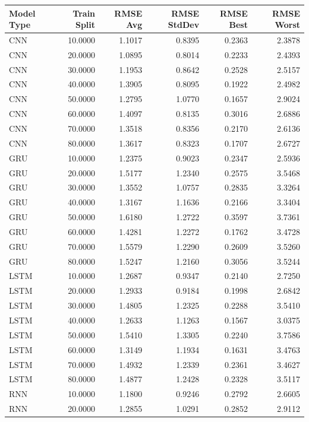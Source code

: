 \begin{tabular}{lrrrrr}
\toprule
Model Type & Train Split & RMSE Avg & RMSE StdDev & RMSE Best & RMSE Worst \\
\midrule
CNN & 10.0000 & 1.1017 & 0.8395 & 0.2363 & 2.3878 \\
CNN & 20.0000 & 1.0895 & 0.8014 & 0.2233 & 2.4393 \\
CNN & 30.0000 & 1.1953 & 0.8642 & 0.2528 & 2.5157 \\
CNN & 40.0000 & 1.3905 & 0.8095 & 0.1922 & 2.4982 \\
CNN & 50.0000 & 1.2795 & 1.0770 & 0.1657 & 2.9024 \\
CNN & 60.0000 & 1.4097 & 0.8135 & 0.3016 & 2.6886 \\
CNN & 70.0000 & 1.3518 & 0.8356 & 0.2170 & 2.6136 \\
CNN & 80.0000 & 1.3617 & 0.8323 & 0.1707 & 2.6727 \\
GRU & 10.0000 & 1.2375 & 0.9023 & 0.2347 & 2.5936 \\
GRU & 20.0000 & 1.5177 & 1.2340 & 0.2575 & 3.5468 \\
GRU & 30.0000 & 1.3552 & 1.0757 & 0.2835 & 3.3264 \\
GRU & 40.0000 & 1.3167 & 1.1636 & 0.2166 & 3.3404 \\
GRU & 50.0000 & 1.6180 & 1.2722 & 0.3597 & 3.7361 \\
GRU & 60.0000 & 1.4281 & 1.2272 & 0.1762 & 3.4728 \\
GRU & 70.0000 & 1.5579 & 1.2290 & 0.2609 & 3.5260 \\
GRU & 80.0000 & 1.5247 & 1.2160 & 0.3056 & 3.5244 \\
LSTM & 10.0000 & 1.2687 & 0.9347 & 0.2140 & 2.7250 \\
LSTM & 20.0000 & 1.2933 & 0.9184 & 0.1998 & 2.6842 \\
LSTM & 30.0000 & 1.4805 & 1.2325 & 0.2288 & 3.5410 \\
LSTM & 40.0000 & 1.2633 & 1.1263 & 0.1567 & 3.0375 \\
LSTM & 50.0000 & 1.5410 & 1.3305 & 0.2240 & 3.7586 \\
LSTM & 60.0000 & 1.3149 & 1.1934 & 0.1631 & 3.4763 \\
LSTM & 70.0000 & 1.4932 & 1.2339 & 0.2361 & 3.4627 \\
LSTM & 80.0000 & 1.4877 & 1.2428 & 0.2328 & 3.5117 \\
RNN & 10.0000 & 1.1800 & 0.9246 & 0.2792 & 2.6605 \\
RNN & 20.0000 & 1.2855 & 1.0291 & 0.2852 & 2.9112 \\

\end{tabular}
